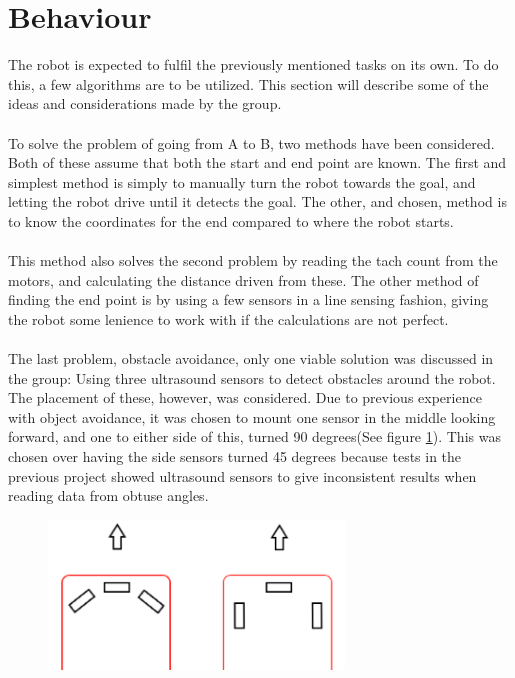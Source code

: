 \section{Behaviour}
The robot is expected to fulfil the previously mentioned tasks on its own. To do this, a few algorithms are to be utilized. This section will describe some of the ideas and considerations made by the group.\\\\
To solve the problem of going from A to B, two methods have been considered. Both of these assume that both the start and end point are known. The first and simplest method is simply to manually turn the robot towards the goal, and letting the robot drive until it detects the goal. The other, and chosen, method is to know the coordinates for the end compared to where the robot starts.\\\\
This method also solves the second problem by reading the tach count from the motors, and calculating the distance driven from these. The other method of finding the end point is by using a few sensors in a line sensing fashion, giving the robot some lenience to work with if the calculations are not perfect.\\\\
The last problem, obstacle avoidance, only one viable solution was discussed in the group: Using three ultrasound sensors to detect obstacles around the robot. The placement of these, however, was considered. Due to previous experience with object avoidance, it was chosen to mount one sensor in the middle looking forward, and one to either side of this, turned 90 degrees(See figure \ref{Hardware_diagram}). This was chosen over having the side sensors turned 45 degrees because tests in the previous project showed ultrasound sensors to give inconsistent results when reading data from obtuse angles.

\begin{figure}[!ht]
	\centering
	\includegraphics[width=0.7\textwidth]{figures/sensorMountingTheory.PNG}
	\caption{}
	\label{Hardware_diagram}
\end{figure}